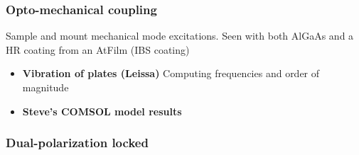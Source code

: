 \subsubsection{Opto-mechanical coupling}
Sample and mount mechanical mode excitations. Seen with both AlGaAs and a HR coating from an AtFilm (IBS coating)
\begin{itemize}
\item \textbf{Vibration of plates (Leissa)} \cite{leissa} Computing frequencies and order of magnitude
\item \textbf{Steve's COMSOL model results}
\end{itemize}

\subsubsection{Dual-polarization locked}
